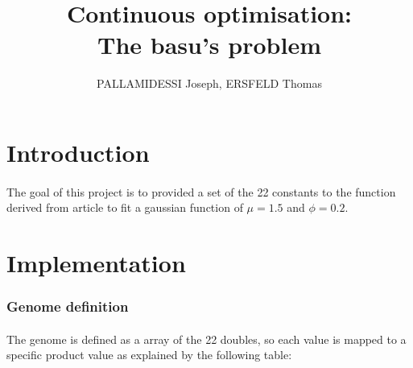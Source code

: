 \documentclass{article}
\begin{document}
  
  \title{Continuous optimisation: \\
    \large The basu's problem}
  \author{PALLAMIDESSI Joseph, ERSFELD Thomas}
  \maketitle
  
  \section{Introduction} %
  \label{sec:Intr}
    \paragraph{} %
    \label{par:}
    The goal of this project is to provided a set of the 22 constants to the
    function derived from article\cite{} to fit a gaussian function of $\mu=1.5$ and
    $\phi=0.2$.


  \section{Implementation} %
  \label{sec:Implementation}
    \subsubsection{Genome definition} %
    \label{ssub:Genome definition}
      
      \paragraph{} %
      \label{par:}
        The genome is defined as a array of the 22 doubles, so each value is mapped to a
        specific product value as explained by the following table:
      \\
      \\
      \\
      \\
\end{document}
